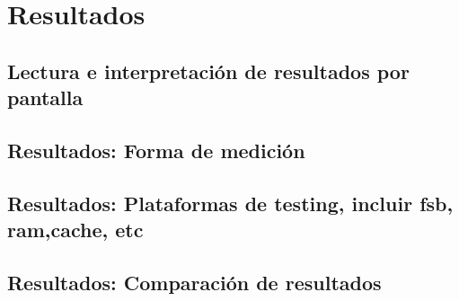 \section{Resultados}
\subsection{Lectura e interpretación de resultados por pantalla}
\subsection{Resultados: Forma de medición}
\subsection{Resultados: Plataformas de testing, incluir fsb, ram,cache, etc }
\subsection{Resultados: Comparación de resultados}
